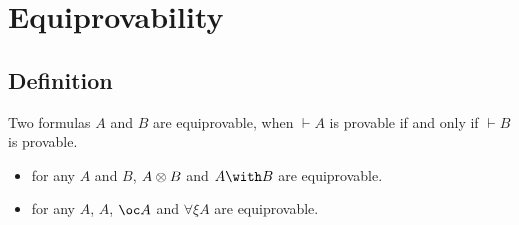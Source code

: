\section{Equiprovability}\label{equiprovability}

\subsection{Definition}

Two formulas \(A\) and \(B\) are equiprovable, when \(\vdash A\) is
provable if and only if \(\vdash B\) is provable.

\begin{itemize}
\tightlist
\item
  for any \(A\) and \(B\), \(A\otimes B\) and \(A\with B\) are
  equiprovable.
\item
  for any \(A\), \(A\), \(\oc A\) and \(\forall\xi A\) are equiprovable.
\end{itemize}


